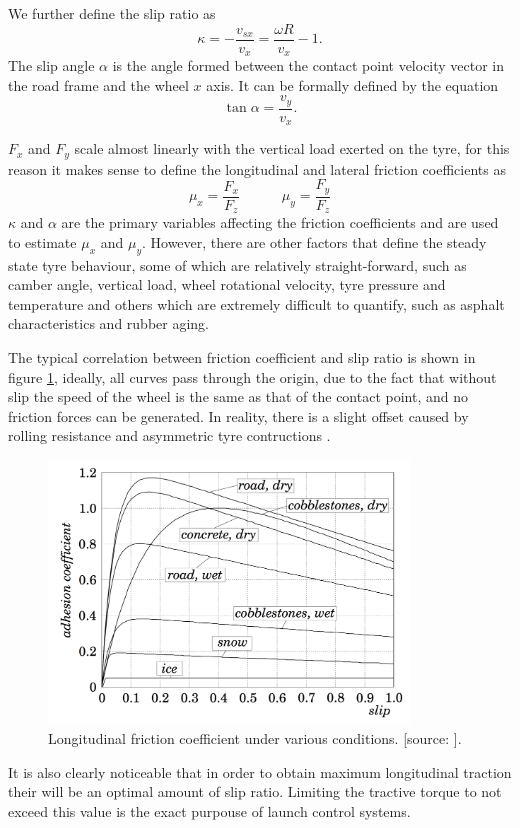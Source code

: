 We further define the slip ratio as
$$ \kappa = - \frac{v_{sx}}{v_{x}} = \frac{\omega R}{v_x}-1.$$
The slip angle $\alpha$ is the angle formed between the contact point velocity vector in the road frame and the wheel $x$ axis. It can be formally defined by the equation
$$\tan{\alpha} = \frac{v_y}{v_x}.$$

$F_x$ and $F_y$ scale almost linearly with the vertical load exerted on the tyre, for this reason it makes sense to define the longitudinal and lateral friction coefficients as
$$ \mu_x = \frac{F_x}{F_z} \quad\quad\quad \mu_y = \frac{F_y}{F_z}$$
$\kappa$ and $\alpha$ are the primary variables affecting the friction coefficients and are used to estimate $\mu_x$ and $\mu_y$. However, there are other factors that define the steady state tyre behaviour, some of which are relatively straight-forward, such as camber angle, vertical load, wheel rotational velocity, tyre pressure and temperature and others which are extremely difficult to quantify, such as asphalt characteristics and rubber aging.

The typical correlation between friction coefficient and slip ratio is shown in
figure \ref{kienckeplot}, ideally, all curves pass through the origin, due to the fact that without slip the speed of the wheel is the same as that of the contact point, and no friction forces can be generated. In reality, there is a slight offset caused by rolling resistance and asymmetric tyre contructions \cite{pac2012}.

\begin{figure}[tb]
  \centering
  \includegraphics[height=7cm]{images/kiencke}
  \caption{Longitudinal friction coefficient under various conditions. [source: \cite{kiencke}].}
  \label{kienckeplot}
\end{figure}


It is also clearly noticeable that in order to obtain maximum longitudinal traction their will be an optimal amount of slip ratio. Limiting the tractive torque to not exceed this value is the exact purpouse of launch control systems.


